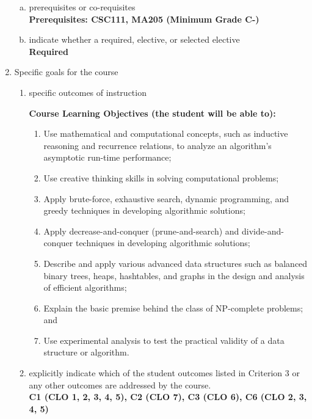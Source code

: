 \begin{enumerate}[1.]
\begin{enumerate}[a.]
\item prerequisites or co-requisites\\
  {\bfseries
    Prerequisites: CSC111, MA205 (Minimum Grade C-)
  }

\item indicate whether a required, elective, or selected elective\\ %
  {\bfseries
    Required
  }

\end{enumerate}

\item Specific goals for the course
\begin{enumerate}
\item specific outcomes of instruction\\ %
  {\bfseries
    Course Learning Objectives (the student will be able to):
\begin{enumerate}
\item Use mathematical and computational concepts, such as inductive reasoning and recurrence relations, to analyze an algorithm's asymptotic run-time performance;
\item Use creative thinking skills in solving computational problems;
\item Apply brute-force, exhaustive search, dynamic programming, and greedy techniques in developing algorithmic solutions;
\item Apply decrease-and-conquer (prune-and-search) and divide-and-conquer techniques in developing
algorithmic solutions;
\item Describe and apply various advanced data structures such as balanced binary trees, heaps,
hashtables, and graphs in the design and analysis of efficient algorithms;
\item Explain the basic premise behind the class of NP-complete problems; and
\item Use experimental analysis to test the practical validity of a data structure or algorithm.
\end{enumerate}
  }

\item explicitly indicate which of the student outcomes listed in Criterion 3 or any other outcomes are addressed by the course.\\
  {\bfseries
    C1 (CLO 1, 2, 3, 4, 5),
    C2 (CLO 7),
    C3 (CLO 6),
    C6 (CLO 2, 3, 4, 5)
  }
\end{enumerate}


\end{enumerate}
